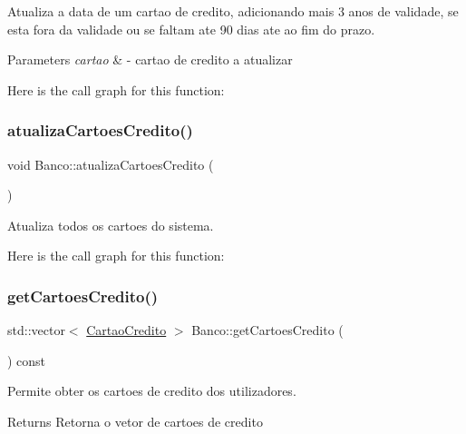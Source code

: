 Atualiza a data de um cartao de credito, adicionando mais 3 anos de validade, se esta fora da validade ou se faltam ate 90 dias ate ao fim do prazo. 


\begin{DoxyParams}{Parameters}
{\em cartao} & -\/ cartao de credito a atualizar \\
\hline
\end{DoxyParams}
Here is the call graph for this function\+:
\mbox{\label{class_banco_ad6f39d091c83361878bc5cfda534a49d}} 
\subsubsection{\texorpdfstring{atualiza\+Cartoes\+Credito()}{atualizaCartoesCredito()}}
{\footnotesize\ttfamily void Banco\+::atualiza\+Cartoes\+Credito (\begin{DoxyParamCaption}{ }\end{DoxyParamCaption})}



Atualiza todos os cartoes do sistema. 

Here is the call graph for this function\+:
\mbox{\label{class_banco_a859463228f6bf63d32d70afe8efd9541}} 
\subsubsection{\texorpdfstring{get\+Cartoes\+Credito()}{getCartoesCredito()}}
{\footnotesize\ttfamily std\+::vector$<$ \mbox{\hyperlink{class_cartao_credito}{Cartao\+Credito}} $>$ Banco\+::get\+Cartoes\+Credito (\begin{DoxyParamCaption}{ }\end{DoxyParamCaption}) const}



Permite obter os cartoes de credito dos utilizadores. 

\begin{DoxyReturn}{Returns}
Retorna o vetor de cartoes de credito 
\end{DoxyReturn}
\mbox{\label{class_banco_a0735f07636c578666068a16f6ecccd91}} 
